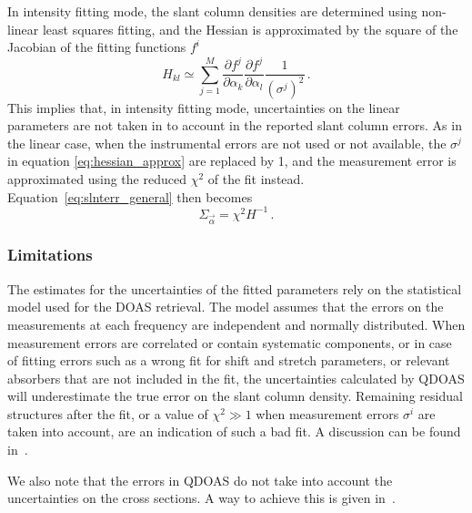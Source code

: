 In intensity fitting mode, the slant column densities are determined
using non-linear least squares fitting, and the Hessian is
approximated by the square of the Jacobian of the fitting functions
$f^i$
\begin{equation}
  \label{eq:hessian_approx}
  H_{kl} \simeq \sum_{j=1}^M \frac{\partial f^j}{\partial \alpha_k}\frac{\partial f^j}{\partial \alpha_l}\frac{1}{(\sigma^j)^2}\,.
\end{equation}
This implies that, in intensity fitting mode, uncertainties on the
linear parameters are not taken in to account in the reported slant
column errors.  As in the linear case, when the instrumental errors
are not used or not available, the $\sigma^j$ in equation
\eqref{eq:hessian_approx} are replaced by 1, and the measurement error
is approximated using the reduced $\chi^2$ of the fit instead.
Equation~\eqref{eq:slnterr_general} then becomes
\begin{equation}
  \label{eq:slnterr_nonlinear_noweighting}
  \Sigma_{\vec{\alpha}} = \chi^2 H^{-1}\,.
\end{equation}

\subsubsection{Limitations}
The estimates for the uncertainties of the fitted parameters rely on
the statistical model used for the DOAS retrieval.  The model assumes
that the errors on the measurements at each frequency are independent
and normally distributed.  When measurement errors are correlated
or contain systematic components, or in case of fitting errors such
as a wrong fit for shift and stretch parameters, or relevant
absorbers that are not included in the fit, the uncertainties
calculated by QDOAS will underestimate the true error on the slant
column density.  Remaining residual structures after the fit, or a
value of $\chi^2 \gg 1$ when measurement errors $\sigma^i$ are taken
into account, are an indication of such a bad fit.  A discussion can
be found in~\citet{stutz_1996}.

We also note that the errors in QDOAS do not take into account the
uncertainties on the cross sections. A way to achieve this is given
in~\citet{Theys2007}.

